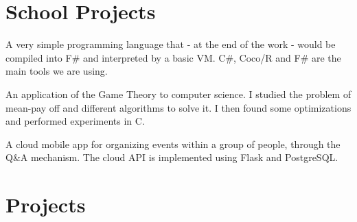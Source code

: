 \documentclass[a4paper]{deedy-resume} %
\begin{document}
\begin{minipage}[t]{0.66\textwidth}
\sectionspace %



\section{School Projects}


A very simple programming language that - at the end of the work - would be compiled into F# and interpreted by a basic VM. C#, Coco/R and F# are the main tools we are using.

\sectionspace %



An application of the Game Theory to computer science. I studied the problem of mean-pay off and different algorithms to solve it. I then found some optimizations and performed experiments in C.
\sectionspace %



A cloud mobile app for organizing events within a group of people, through the Q&A mechanism. The cloud API is implemented using Flask and PostgreSQL.

\sectionspace %


\section{Projects}



\end{minipage}
\end{document}
